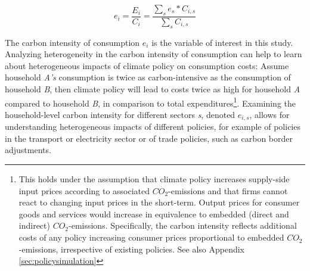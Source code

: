 \documentclass[12pt, a4paper]{article}
\begin{document}

\begin{equation} \label{eq:Ci}
e_{i} = \frac{E_{i}}{C_{i}} = \frac{\sum_{s} e_{s}*C_{i,s}}{\sum_{s} C_{i,s}}
\end{equation}


The carbon intensity of consumption $e_{i}$ is the variable of interest in this study. Analyzing heterogeneity in the carbon intensity of consumption can help to learn about heterogeneous impacts of climate policy on consumption costs: Assume household \textit{A's} consumption is twice as carbon-intensive as the consumption of household \textit{B}, then climate policy will lead to costs twice as high for household \textit{A} compared to household \textit{B}, in comparison to total expenditures\footnote{This holds under the assumption that climate policy increases supply-side input prices according to associated $CO_{2}$-emissions and that firms cannot react to changing input prices in the short-term. Output prices for consumer goods and services would increase in equivalence to embedded (direct and indirect) $CO_{2}$-emissions. Specifically, the carbon intensity reflects additional costs of any policy increasing consumer prices proportional to embedded $CO_{2}$-emissions, irrespective of existing policies. See also Appendix \ref{sec:policysimulation}}. Examining the household-level carbon intensity for different sectors \textit{s}, denoted $e_{i,s}$, allows for understanding heterogeneous impacts of different policies, for example of policies in the transport or electricity sector or of trade policies, such as carbon border adjustments.

\end{document}
